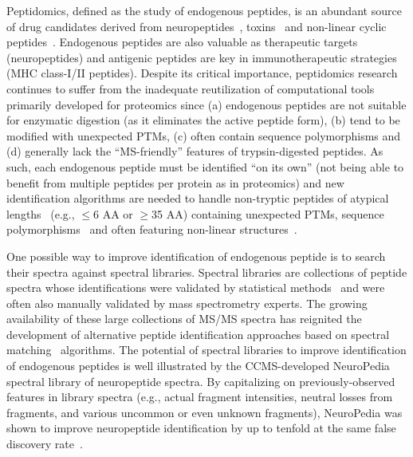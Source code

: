 \documentclass[arial,11pt]{article}
\begin{document}
Peptidomics, defined as the study of endogenous peptides, is an abundant source of drug candidates derived from neuropeptides~\cite{robertson11}, toxins~\cite{king11} and non-linear cyclic peptides~\cite{colgrave10}. Endogenous peptides are also valuable as therapeutic targets~\cite{jaggi11} (neuropeptides) and antigenic peptides are key in immunotherapeutic strategies~\cite{depontieu09} (MHC class-I/II peptides). Despite its critical importance, peptidomics research continues to suffer from the inadequate reutilization of computational tools primarily developed for proteomics since (a) endogenous peptides are not suitable for enzymatic digestion (as it eliminates the active peptide form), (b) tend to be modified with unexpected PTMs, (c) often contain sequence polymorphisms and (d) generally lack the ``MS-friendly'' features of trypsin-digested peptides. As such, each endogenous peptide must be identified ``on its own'' (not being able to benefit from multiple peptides per protein as in proteomics) and new identification algorithms are needed to handle non-tryptic peptides of atypical lengths~\cite{jaggi11} (e.g., $\leq$6 AA or $\geq$35 AA) containing unexpected PTMs, sequence polymorphisms~\cite{klug09,colgrave10} and often featuring non-linear structures~\cite{king11,colgrave10}.

One possible way to improve identification of endogenous peptide is to search their spectra against spectral libraries.
 Spectral libraries are collections of peptide spectra whose identifications were validated by statistical methods~\cite{keller02,elias07} and were often also manually validated by mass spectrometry experts. The growing availability of these large collections of MS/MS spectra has reignited the development of alternative peptide identification approaches based on spectral matching~\cite{craig06,frewen06,lam07,wang10} algorithms. The potential of spectral libraries to improve identification of endogenous peptides is well illustrated by the CCMS-developed NeuroPedia~\cite{kim11neuropedia} spectral library of neuropeptide spectra. By capitalizing on previously-observed features in library spectra (e.g., actual fragment intensities, neutral losses from fragments, and various uncommon or even unknown fragments), NeuroPedia was shown to improve neuropeptide identification by up to tenfold at the same false discovery rate~\cite{lam10}.
\end{document}
